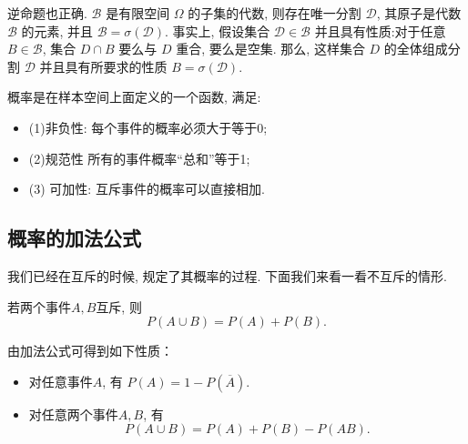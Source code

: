 逆命题也正确. $\mathscr{B}$ 是有限空间 $\Omega$ 的子集的代数, 则存在唯一分割 $\mathscr{D}$, 其原子是代数 $\mathscr{B}$ 的元素, 并且 $\mathscr{B}=\sigma(\mathscr{D})$. 事实上, 假设集合 $\mathscr{D} \in \mathscr{B}$ 并且具有性质:对于任意 $B \in \mathscr{B}$, 集合 $D \cap B$ 要么与 $D$ 重合, 要么是空集. 那么, 这样集合 $D$ 的全体组成分割 $\mathscr{D}$ 并且具有所要求的性质 $B=\sigma(\mathscr{D})$. 



\begin{takeaway}
    概率是在样本空间上面定义的一个函数, 满足: 
    \begin{itemize}
        \item (1)非负性: 每个事件的概率必须大于等于0; 
        \item (2)规范性
        所有的事件概率``总和''等于1; 
        \item (3) 可加性: 互斥事件的概率可以直接相加.
    \end{itemize}
\end{takeaway}
    


\subsection{概率的加法公式}
我们已经在互斥的时候, 规定了其概率的过程. 下面我们来看一看不互斥的情形.
\begin{proposition}[加法公式]
    若两个事件$A,B$互斥, 则
    $$P(A\cup B)=P(A)+P(B).$$
\end{proposition}

\begin{remark}
    由加法公式可得到如下性质：
    \begin{itemize}
        \item 对任意事件$A$, 有
              $P(A)=1-P\left(\overline{A}\right).$
        \item 对任意两个事件$A,B$, 有
              $$P(A\cup B)=P(A)+P(B)-P(AB).$$
    \end{itemize}
\end{remark}

